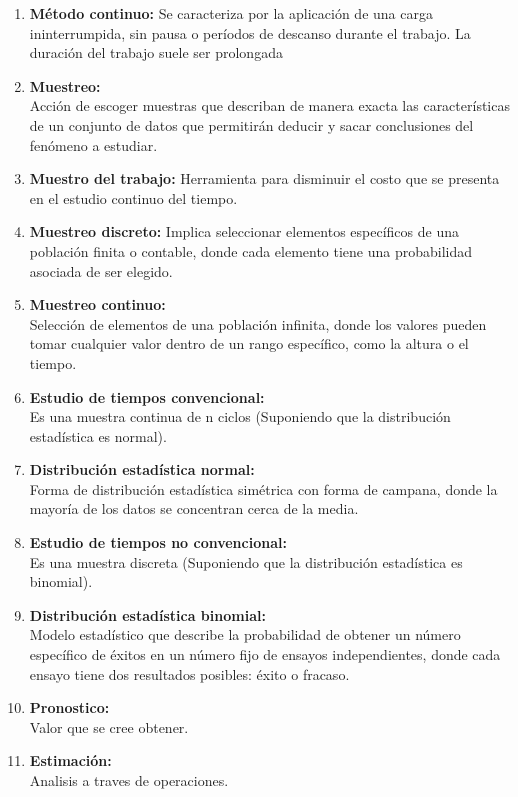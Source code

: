 \begin{enumerate}
\item \textbf{Método continuo:} Se caracteriza por la aplicación de una carga ininterrumpida, sin pausa o períodos de descanso durante el trabajo. La duración del trabajo suele ser prolongada

\item \textbf{Muestreo:}
    \\Acción de escoger muestras que describan de manera exacta las características de un conjunto de datos que permitirán deducir y sacar conclusiones del fenómeno a estudiar.

\item \textbf{Muestro del trabajo:} Herramienta para disminuir el costo que se presenta en el estudio continuo del tiempo.

\item \textbf{Muestreo discreto:} Implica seleccionar elementos específicos de una población finita o contable, donde cada elemento tiene una probabilidad asociada de ser elegido.

\item \textbf{Muestreo continuo: }
    \\Selección de elementos de una población infinita, donde los valores pueden tomar cualquier valor dentro de un rango específico, como la altura o el tiempo.

\item \textbf{Estudio de tiempos convencional: }
    \\Es una muestra continua de n ciclos (Suponiendo que la distribución estadística es normal).


\item \textbf{Distribución estadística normal: }
    \\Forma de distribución estadística simétrica con forma de campana, donde la mayoría de los datos se concentran cerca de la media.

\item \textbf{Estudio de tiempos no convencional: }
    \\Es una muestra discreta (Suponiendo que la distribución estadística es binomial).


\item \textbf{Distribución estadística binomial: }
    \\Modelo estadístico que describe la probabilidad de obtener un número específico de éxitos en un número fijo de ensayos independientes, donde cada ensayo tiene dos resultados posibles: éxito o fracaso.

\item \textbf{Pronostico: }
    \\Valor que se cree obtener.

\item \textbf{Estimación: }
    \\Analisis a traves de operaciones.

\end{enumerate}